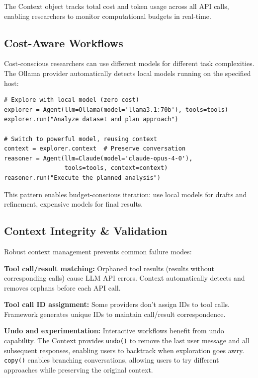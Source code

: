 \documentclass{article}
\begin{document}
The Context object tracks total cost and token usage across all API calls, enabling researchers to monitor computational budgets in real-time.

\subsection{Cost-Aware Workflows}

Cost-conscious researchers can use different models for different task complexities. The Ollama provider automatically detects local models running on the specified host:

\begin{verbatim}
# Explore with local model (zero cost)
explorer = Agent(llm=Ollama(model='llama3.1:70b'), tools=tools)
explorer.run("Analyze dataset and plan approach")

# Switch to powerful model, reusing context
context = explorer.context  # Preserve conversation
reasoner = Agent(llm=Claude(model='claude-opus-4-0'),
                 tools=tools, context=context)
reasoner.run("Execute the planned analysis")
\end{verbatim}

This pattern enables budget-conscious iteration: use local models for drafts and refinement, expensive models for final results.

\subsection{Context Integrity \& Validation}

Robust context management prevents common failure modes:

\textbf{Tool call/result matching:} Orphaned tool results (results without corresponding calls) cause LLM API errors. Context automatically detects and removes orphans before each API call.

\textbf{Tool call ID assignment:} Some providers don't assign IDs to tool calls. Framework generates unique IDs to maintain call/result correspondence.

\textbf{Undo and experimentation:} Interactive workflows benefit from undo capability. The Context provides \texttt{undo()} to remove the last user message and all subsequent responses, enabling users to backtrack when exploration goes awry. \texttt{copy()} enables branching conversations, allowing users to try different approaches while preserving the original context.
\end{document}
